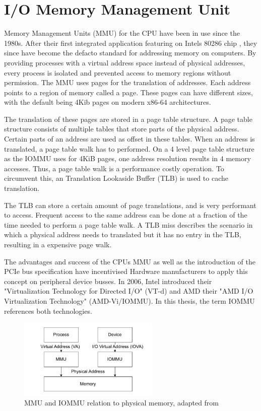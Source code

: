 \section{I/O Memory Management Unit}
Memory Management Units (MMU) for the CPU have been in use since the 1980s. After their first integrated application featuring on Intels 80286 chip \cite{intel80286}, they since have become the defacto standard for addressing memory on computers. By providing processes with a virtual address space instead of physical addresses, every process is isolated and prevented access to memory regions without permission. The MMU uses pages for the translation of addresses. Each address points to a region of memory called a page. These pages can have different sizes, with the default being 4Kib pages on modern x86-64 architectures.

The translation of these pages are stored in a page table structure. A page table structure consists of multiple tables that store parts of the physical address. Certain parts of an address are used as offset in these tables. When an address is translated, a page table walk has to performed. On a 4 level page table structure as the IOMMU uses for 4KiB pages, one address resolution results in 4 memory accesses. Thus, a page table walk is a performance costly operation. To circumvent this, an Translation Lookaside Buffer (TLB) is used to cache translation.

The TLB can store a certain amount of page translations, and is very performant to access. Frequent access to the same address can be done at a fraction of the time needed to perform a page table walk. A TLB miss describes the scenario in which a physical address needs to translated but it has no entry in the TLB, resulting in a expensive page walk.

The advantages and success of the CPUs MMU as well as the introduction of the PCIe bus specification have incentivised Hardware manufacturers to apply this concept on peripheral device busses. In 2006, Intel introduced their "Virtualization Technology for Directed I/O" (VT-d) and AMD their "AMD I/O Virtualization Technology" (AMD-Vi/IOMMU). In this thesis, the term IOMMU references both technologies.

\begin{figure}
    \centering
    \includegraphics[width=0.6\textwidth]{figures/MMUIOMMU.pdf}
    \caption{MMU and IOMMU relation to physical memory, adapted from \cite{iommuscalability}}
    \label{fig:mmuvsiommu}
\end{figure}

